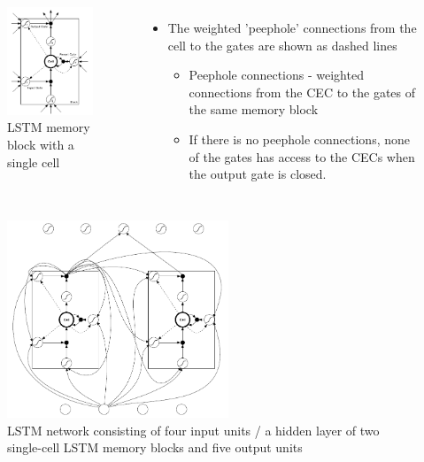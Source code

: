 \documentclass{beamer}
\begin{document}
{
	\begin{columns}
		\begin{figure}[ht]  
			\begin{center}
				\includegraphics[width=1.8in]{Images/LSTM_detail.png}   
			\end{center}   
			\caption{\centering LSTM memory block with a single cell}
		\end{figure}
		\begin{itemize}
			\item The weighted 'peephole' connections from the cell to the gates are shown as dashed lines
			\begin{itemize}
				\item Peephole connections - weighted connections from the CEC to the gates of the same memory block
				\item If there is no peephole connections, none of the gates has access to the CECs when the output gate is closed. 
			\end{itemize}	
		\end{itemize}
	\end{columns}
}
\frame
{
		\begin{figure}[ht]  
			\begin{center}
				\includegraphics[width=2.6in]{Images/LSTM_network.png}   
			\end{center}   
			\caption{\centering LSTM network consisting of four input units / a hidden layer of two single-cell LSTM memory blocks and five output units}
		\end{figure}
}
\end{document}
